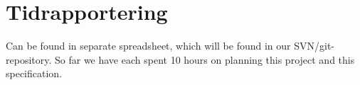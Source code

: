 \documentclass[12pt,a4paper]{article}
\begin{document}
\section{Tidrapportering}

Can be found in separate spreadsheet, which will be found in our SVN/git-repository.
So far we have each spent 10 hours on planning this project and this specification.


\end{document}
